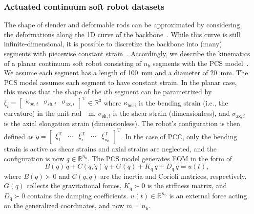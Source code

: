 \subsubsection{Actuated continuum soft robot datasets}\label{ssub:con:soft_robot_dataset}
The shape of slender and deformable rods can be approximated by considering the deformations along the 1D curve of the backbone~\cite{gazzola2018forward}. While this curve is still infinite-dimensional, it is possible to discretize the backbone into (many) segments with piecewise constant strain~\cite{renda2016discrete, gazzola2018forward}.
Accordingly, we describe the kinematics of a planar continuum soft robot consisting of $n_\mathrm{b}$ segments with the \gls{PCS} model~\cite{renda2016discrete}. We assume each segment has a length of \SI{100}{mm} and a diameter of \SI{20}{mm}.
The \gls{PCS} model assumes each segment to have constant strain. In the planar case, this means that the shape of the $i$th segment can be parametrized by $\xi_i = \begin{bmatrix}
    \kappa_{\mathrm{be},i} & \sigma_{\mathrm{sh},i} & \sigma_{\mathrm{ax},i}
\end{bmatrix}^\mathrm{T} \in \mathbb{R}^{3}$ where $\kappa_{\mathrm{be},i}$ is the bending strain (i.e., the curvature) in the unit \si{rad \per \meter}, $\sigma_{\mathrm{sh},i}$ is the shear strain  (dimensionless), and $\sigma_{\mathrm{ax},i}$ is the axial elongation strain (dimensionless).
The robot's configuration is then defined as $q = \begin{bmatrix}
    \xi_1^\mathrm{T} & \cdots & \xi_i^\mathrm{T} & \cdots & \xi_{n_\mathrm{b}}^\mathrm{T}
\end{bmatrix}^\mathrm{T}$.
In the case of \gls{PCC}, only the bending strain is active as shear strains and axial strains are neglected, and the configuration is now $q \in \mathbb{R}^{n_\mathrm{b}}$.
The \gls{PCS} model generates \gls{EOM} in the form of~\cite{della2023model}
\begin{equation}
    B(q) \, \ddot{q} + C(q,\dot{q}) \, \dot{q} + G(q) + K_\mathrm{q} \, q + D_\mathrm{q} \, \dot{q} = u(t),
\end{equation}
where $B(q) \succ 0$ and $C(q,\dot{q})$ are the inertia and Corioli matrices, respectively. $G(q)$ collects the gravitational forces, $K_\mathrm{q} \succ 0$ is the stiffness matrix, and $D_\mathrm{q} \succ 0$ contains the damping coefficients. 
$u(t) \in \mathbb{R}^{n_\mathrm{b}}$ is an external force acting on the generalized coordinates, and now $m = n_\mathrm{b}$.


